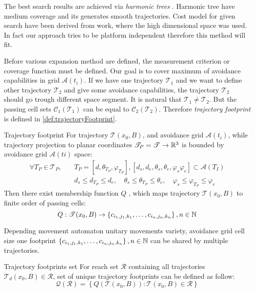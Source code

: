 The best search results are achieved via \emph{harmonic trees} \cite{grunewald2002harmonic}. Harmonic tree have medium coverage and its generates smooth trajectories. Cost model for given search have been derived from \cite{berchtold1997cost} work, where the high dimensional space was used. In fact our approach tries to be platform independent therefore this method will fit. 

Before various expansion method are defined, the measurement criterion or coverage function must be defined. Our goal is to cover maximum of avoidance capabilities in grid $\mathscr{A}(t_i)$. If we have one trajectory $\mathscr{T}_1$ and we want to define other trajectory $\mathscr{T}_2$ and give some avoidance capabilities, the trajectory $\mathscr{T}_2$ should go trough different space segment. It is natural that $\mathscr{T}_1\neq\mathscr{T}_2$. But the passing cell sets $\mathscr{C}_1(\mathscr{T}_1)$ can be equal to $\mathscr{C}_2(\mathscr{T}_2)$. Therefore \emph{trajectory footprint} is defined in \ref{def:trajectoryFootprint}.

\begin{definition}{Trajectory footprint}\label{def:trajectoryFootprint} For trajectory $\mathscr{T}(x_0,B)$, and avoidance grid $\mathscr{A}(t_i)$, while trajectory projection to planar coordinates $\mathscr{T}_P=\mathscr{T}\to\mathbb{R}^3$ is bounded  by avoidance grid $\mathscr{A}(ti)$ space:
\begin{equation}
\begin{aligned}
    \forall T_P\in \mathscr{T}_P,\quad &T_P = [d,\theta_{T_P},\varphi_{T_P}], [d_s,d_e,\theta_s,\theta_e,\varphi_s\varphi_e]\subset\mathscr{A}(T_I)\\
    & d_s \le d_{T_P} \le d_e ,\quad \theta_s \le \theta_{T_P} \le \theta_e,\quad \varphi_s \le \varphi_{T_P} \le \varphi_e
\end{aligned}
\end{equation}
\noindent Then there exist membership function $Q$ , which maps trajectory $\mathscr{T}(x_0,B)$ to finite order of passing cells:
\begin{equation}
    Q:\mathscr{T}(x_0,B)\to \left\{c_{i_1,j_1,k_1},\dots,c_{i_n,j_n,k_n}\right\},n\in\mathbb{N}
\end{equation}
\end{definition}
\begin{corollary}
\noindent Depending movement automaton unitary movements variety, avoidance grid cell size one footprint $\left\{c_{i_1,j_1,k_1},\dots,c_{i_n,j_n,k_n}\right\},n\in\mathbb{N}$ can be shared by multiple trajectories.
\end{corollary}
\begin{definition}{Trajectory footprints set}\label{def:trajectoryFootprintSet}
For reach set $\mathscr{R}$ containing all trajectories $\mathscr{T}_d(x_0,B)\in\mathscr{R}$, set of unique trajectory footprints can be defined as follow:
\begin{equation}
    \mathscr{Q}(\mathscr{R}) = \left\{ Q(\mathscr{T}(x_0,B)):\mathscr{T}(x_0,B)\in\mathscr{R}\right\}
\end{equation}
\end{definition}

